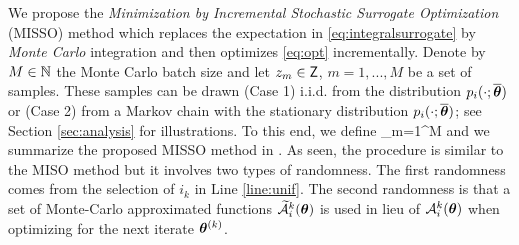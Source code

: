 \documentclass[11pt]{article}
\makeatletter
\theoremstyle{t}
\DeclareRobustCommand*\cal{\@fontswitch\relax\mathcal}
\makeatother
\begin{document}
We propose the \emph{Minimization by Incremental Stochastic Surrogate Optimization} (MISSO) method  which replaces the expectation in \eqref{eq:integralsurrogate} by \emph{Monte Carlo} integration and then optimizes \eqref{eq:opt} incrementally.
Denote by $M \in \NN$ the Monte Carlo batch size and let $z_m \in \Zset$, $m=1,...,M$ be a set of samples. These samples can be drawn
{\sf (Case 1)} i.i.d. from the distribution $p_i( \cdot ; \op )$ or {\sf (Case 2)}  from a Markov chain with the stationary distribution $p_{i}(\cdot; \op)$; see Section \ref{sec:analysis} for illustrations.
To this end, we define
\beq \label{eq:ssur}  
 \eqdef {} \sum_{m=1}^{M} 
\eeq
and we summarize the proposed MISSO method in .
As seen, the procedure is similar to the MISO method but it involves two types of randomness. The first randomness comes from the selection of $i_k$ in Line \ref{line:unif}. The second randomness is that a set of Monte-Carlo approximated functions $\tafct{i}{k}{\param}$ is used in lieu of $\tafctdet{i}{k}{\param}$ when optimizing for the next iterate $\param^{(k)}$.
\end{document}
